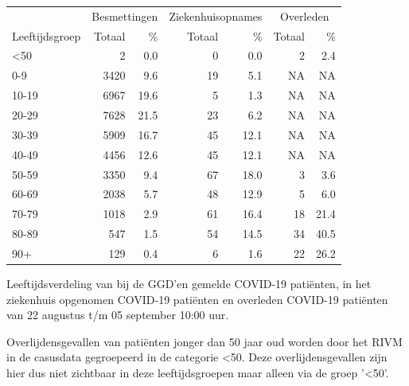 \documentclass[
  english,
  man,floatsintext]{apa6}
\begin{document}
\begin{table}
\centering\begingroup\fontsize{11}{13}\selectfont

\begin{threeparttable}
\begin{tabular}{lrrrrrr}
\toprule
\multicolumn{1}{c}{ } & \multicolumn{2}{c}{Besmettingen} & \multicolumn{2}{c}{Ziekenhuisopnames} & \multicolumn{2}{c}{Overleden} \\
\cmidrule(l{3pt}r{3pt}){2-3} \cmidrule(l{3pt}r{3pt}){4-5} \cmidrule(l{3pt}r{3pt}){6-7}
Leeftijdsgroep & Totaal & \% & Totaal & \% & Totaal & \%\\
\midrule
<50 & 2 & 0.0 & 0 & 0.0 & 2 & 2.4\\
0-9 & 3420 & 9.6 & 19 & 5.1 & NA & NA\\
10-19 & 6967 & 19.6 & 5 & 1.3 & NA & NA\\
20-29 & 7628 & 21.5 & 23 & 6.2 & NA & NA\\
30-39 & 5909 & 16.7 & 45 & 12.1 & NA & NA\\
40-49 & 4456 & 12.6 & 45 & 12.1 & NA & NA\\
50-59 & 3350 & 9.4 & 67 & 18.0 & 3 & 3.6\\
60-69 & 2038 & 5.7 & 48 & 12.9 & 5 & 6.0\\
70-79 & 1018 & 2.9 & 61 & 16.4 & 18 & 21.4\\
80-89 & 547 & 1.5 & 54 & 14.5 & 34 & 40.5\\
90+ & 129 & 0.4 & 6 & 1.6 & 22 & 26.2\\
\bottomrule
\end{tabular}
\begin{tablenotes}
\item[1] Leeftijdsverdeling van bij de GGD’en gemelde COVID-19 patiënten, in het ziekenhuis opgenomen COVID-19 patiënten en overleden COVID-19 patiënten van 22 augustus t/m 05 september 10:00 uur.
\item[2] Overlijdensgevallen van patiënten jonger dan 50 jaar oud worden door het RIVM in de casusdata gegroepeerd in de categorie <50. Deze overlijdensgevallen zijn hier dus niet zichtbaar in deze leeftijdsgroepen maar alleen via de groep '<50'.
\end{tablenotes}
\end{threeparttable}
\endgroup{}
\end{table}

\newpage
\end{document}
